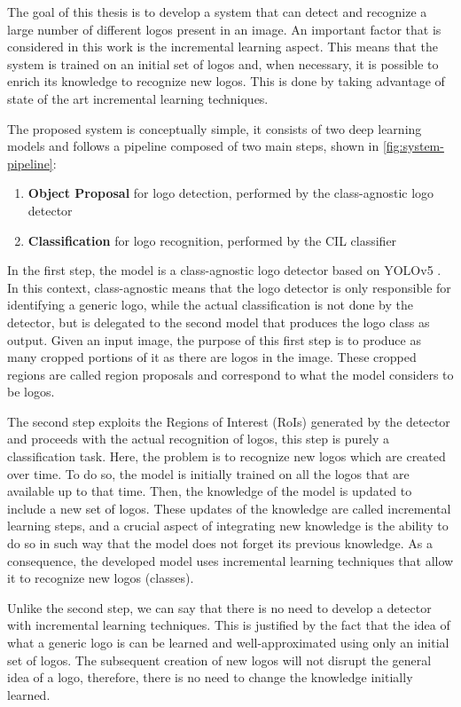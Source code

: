 The goal of this thesis is to develop a system that can detect and recognize 
a large number of different logos present in an image. An important factor that is considered in this work is the incremental learning aspect. This means that the system is trained on an initial set of logos and, when necessary, it is possible to enrich its knowledge to recognize new logos. This is done by taking advantage of state of the art incremental learning techniques.

The proposed system is conceptually simple, it consists of two deep learning models and follows a pipeline composed of two main steps, shown in \autoref{fig:system-pipeline}:

\begin{enumerate}
    \item \textbf{Object Proposal} for logo detection, performed by the class-agnostic logo detector
    \item \textbf{Classification} for logo recognition, performed by the CIL classifier
\end{enumerate}

In the first step, the model is a class-agnostic logo detector based on YOLOv5 \cite{glenn_jocher_2021_5563715}. In this context, class-agnostic means that the logo detector is only responsible for identifying a generic logo, while the actual classification is not done by the detector, but is delegated to the second model that produces the logo class as output.
Given an input image, the purpose of this first step is to produce as many cropped portions of it as there are logos in the image. These cropped regions are called region proposals and correspond to what the model considers to be logos.

The second step exploits the Regions of Interest (RoIs) generated by the detector and proceeds with the actual recognition of logos, this step is purely a classification task.
Here, the problem is to recognize new logos which are created over time. To do so, the model is initially trained on all the logos that are available up to that time. Then, the knowledge of the model is updated to include a new set of logos. These updates of the knowledge are called incremental learning steps, and a crucial aspect of integrating new knowledge is the ability to do so in such way that the model does not forget its previous knowledge. As a consequence, the developed model uses incremental learning techniques that allow it to recognize new logos (classes).

Unlike the second step, we can say that there is no need to develop a detector with incremental learning techniques. This is justified by the fact that the idea of what a generic logo is can be learned and well-approximated using only an initial set of logos. The subsequent creation of new logos will not disrupt the general idea of a logo, therefore, there is no need to change the knowledge initially learned.

